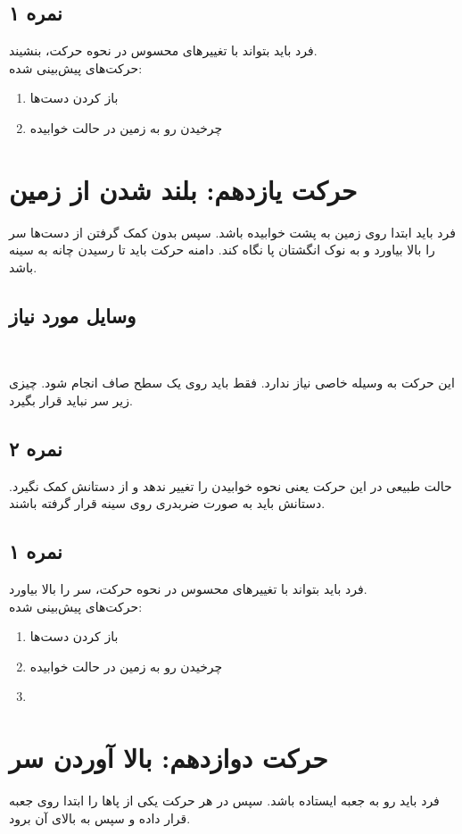 \documentclass[12pt]{report}
\begin{document}
	\subsection*{نمره ۱}
	فرد باید بتواند با تغییر‌های محسوس در نحوه حرکت، بنشیند.\\
	حرکت‌های پیش‌بینی شده:
	\begin{enumerate}
		\item باز کردن دست‌ها
		\item چرخیدن رو به زمین در حالت خوابیده
	\end{enumerate}
	\newpage
	
	\section*{حرکت یازدهم: بلند شدن از زمین}
فرد باید ابتدا روی زمین به پشت خوابیده باشد. سپس بدون کمک گرفتن از دست‌ها سر را بالا بیاورد و به نوک انگشتان پا نگاه کند. دامنه حرکت باید تا رسیدن چانه به سینه باشد.
	‍\subsection*{وسایل مورد نیاز}
	‍‍‍‍
	این حرکت به وسیله خاصی نیاز ندارد. فقط باید روی یک سطح صاف انجام شود. چیزی زیر سر نباید قرار بگیرد.
	\subsection*{نمره ۲}
	حالت طبیعی در این حرکت یعنی نحوه خوابیدن را تغییر ندهد و از دستانش کمک نگیرد. دستانش باید به صورت ضربدری روی سینه قرار گرفته باشند.
	\subsection*{نمره ۱}
	فرد باید بتواند با تغییر‌های محسوس در نحوه حرکت، سر را بالا بیاورد.\\
	حرکت‌های پیش‌بینی شده:
	\begin{enumerate}
		\item باز کردن دست‌ها
		\item چرخیدن رو به زمین در حالت خوابیده
		\item {}
	\end{enumerate}
	\newpage
	
	\section*{حرکت دوازدهم: بالا آوردن سر}
	فرد باید رو به جعبه ایستاده باشد. سپس در هر حرکت یکی از پاها را ابتدا روی جعبه قرار داده و سپس به بالای آن برود.
\end{document}
